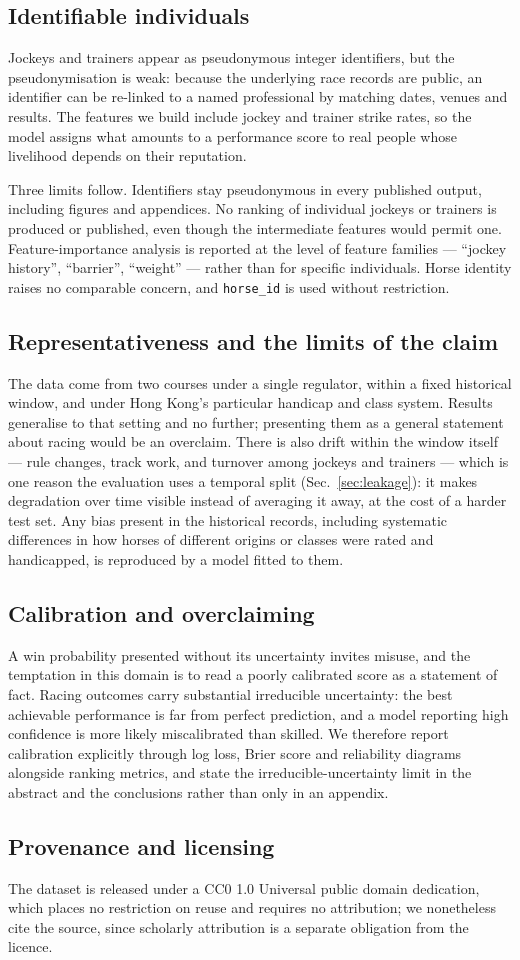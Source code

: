 \subsection{Identifiable individuals}

Jockeys and trainers appear as pseudonymous integer identifiers, but the
pseudonymisation is weak: because the underlying race records are public,
an identifier can be re-linked to a named professional by matching dates,
venues and results. The features we build include jockey and trainer strike
rates, so the model assigns what amounts to a performance score to real
people whose livelihood depends on their reputation.

Three limits follow. Identifiers stay pseudonymous in every published
output, including figures and appendices. No ranking of individual jockeys
or trainers is produced or published, even though the intermediate
features would permit one. Feature-importance analysis is reported at the
level of feature families --- ``jockey history'', ``barrier'', ``weight''
--- rather than for specific individuals. Horse identity raises no
comparable concern, and \texttt{horse\_id} is used without restriction.

\subsection{Representativeness and the limits of the claim}

The data come from two courses under a single regulator, within a fixed
historical window, and under Hong Kong's particular handicap and class
system. Results generalise to that setting and no further; presenting them
as a general statement about racing would be an overclaim. There is also
drift within the window itself --- rule changes, track work, and turnover
among jockeys and trainers --- which is one reason the evaluation uses a
temporal split (Sec.~\ref{sec:leakage}): it makes degradation over time
visible instead of averaging it away, at the cost of a harder test set.
Any bias present in the historical records, including systematic
differences in how horses of different origins or classes were rated and
handicapped, is reproduced by a model fitted to them.

\subsection{Calibration and overclaiming}

A win probability presented without its uncertainty invites misuse, and
the temptation in this domain is to read a poorly calibrated score as a
statement of fact. Racing outcomes carry substantial irreducible
uncertainty: the best achievable performance is far from perfect
prediction, and a model reporting high confidence is more likely
miscalibrated than skilled. We therefore report calibration explicitly
through log loss, Brier score and reliability diagrams alongside ranking
metrics, and state the irreducible-uncertainty limit in the abstract and
the conclusions rather than only in an appendix.

\subsection{Provenance and licensing}

The dataset is released under a CC0 1.0 Universal public
domain dedication, which places no restriction on reuse and
requires no attribution; we nonetheless cite the source, since
scholarly attribution is a separate obligation from the licence.